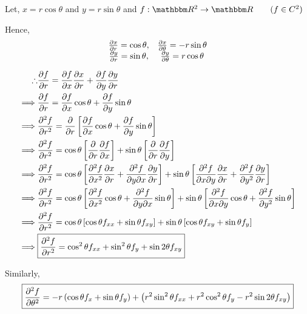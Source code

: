\documentclass[../Analysis-3]{subfiles}
\begin{document}
Let, $x = r\cos{\theta}$ and $y= r\sin{\theta}$ and $f : \R^2 \to \R \qquad ( f \in C^2) $

Hence,
\[\begin{matrix}
		\pdv{x}{r} = \cos{\theta}, & \pdv{x}{\theta} = -r\sin{\theta} \\
		\pdv{y}{r} = \sin{\theta}, & \pdv{y}{\theta} = r\cos{\theta}
	\end{matrix}\]

\begin{align*}
	\therefore & \pdv{f}{r} = \pdv{f}{x} \pdv{x}{r} + \pdv{f}{y}\pdv{y}{r}                                                                                                                               \\
	\implies   & \pdv{f}{r} = \pdv{f}{x} \cos{\theta} + \pdv{f}{y}\sin{\theta}                                                                                                                           \\
	\implies   & \pdv[2]{f}{r} = \pdv{}{r} \left[\pdv{f}{x} \cos{\theta} + \pdv{f}{y} \sin{\theta} \right]                                                                                               \\
	\implies   & \pdv[2]{f}{r} = \cos{\theta} \left[\pdv{}{r} \pdv{f}{x}\right] + \sin{\theta} \left[\pdv{}{r} \pdv{f}{y} \right]                                                                        \\
	\implies   & \pdv[2]{f}{r} = \cos{\theta} \left[\pdv[2]{f}{x} \pdv{x}{r} + \pdv{f}{y}{x} \pdv{y}{r} \right] + \sin{\theta} \left[\pdv{f}{x}{y} \pdv{x}{r} + \pdv[2]{f}{y} \pdv{y}{r} \right]         \\
	\implies   & \pdv[2]{f}{r} = \cos{\theta} \left[\pdv[2]{f}{x} \cos{\theta} + \pdv{f}{y}{x} \sin{\theta} \right] + \sin{\theta} \left[\pdv{f}{x}{y} \cos{\theta} + \pdv[2]{f}{y} \sin{\theta} \right] \\
	\implies   & \pdv[2]{f}{r} = \cos{\theta} \left[\cos{\theta} f_{xx} + \sin{\theta} f_{xy} \right] + \sin{\theta} \left[\cos{\theta} f_{xy} + \sin{\theta} f_{y} \right]                              \\
	\implies   & \boxed{\pdv[2]{f}{r} = \cos^2 \theta f_{xx} + \sin^2 \theta f_{y} + \sin 2 \theta f_{xy}}
\end{align*}


Similarly, \[ \boxed{\pdv[2]{f}{\theta} = -r \left( \cos{\theta} f_x + \sin{\theta} f_y \right) + \left( r^2\sin^2 \theta f_{xx} + r^2\cos^2 \theta f_{y} - r^2\sin 2 \theta f_{xy} \right)} \]
\end{document}
